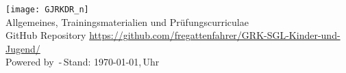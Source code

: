 	\begin{center}
		\texttt{[image: GJRKDR\_n]}\\
		Allgemeines, Trainingsmaterialien und Prüfungscurriculae{\scriptsize \\\textsf{GitHub Repository \href{https://github.com/fregattenfahrer/GRK-SGL-Kinder-und-Jugend/}{https://github.com/fregattenfahrer/GRK-SGL-Kinder-und-Jugend/}} \\\textsf{Powered by} \LaTeXe \textsf{\,-\,Stand: \today,\,\currenttime Uhr}} 
	\end{center}
	